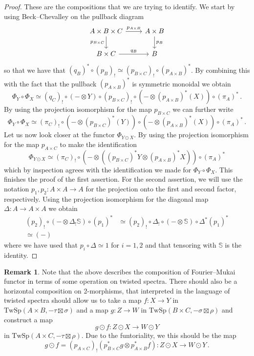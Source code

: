 \documentclass[10pt]{amsart}
\newcommand{\longto}{\longrightarrow}
\theoremstyle{plain}
\theoremstyle{definition}
\newtheorem{rmk}[theorem]{Remark}
\newcommand{\bS}{\mathbb{S}}
\newcommand{\TwSp}{\mathrm{TwSp}}
\begin{document}
\begin{proof}
  These are the compositions that we are trying to identify.
  We start by using Beck--Chevalley on the pullback diagram
  \[
  \begin{tikzcd}
    A \times B \times C \arrow[r,"p_{A \times B}"] \arrow[d,"p_{B \times C}"'] & A \times B \arrow[d,"p_B"] \\
    B \times C \arrow[r,"q_B"] & B
  \end{tikzcd}
  \]
  so that we have that $(q_B)^* \circ (p_B)_! \simeq (p_{B \times C})_! \circ (p_{A \times B})^*$. By combining this with the fact that the pullback $(p_{A \times B})^*$ is symmetric monoidal we obtain
  \[
  \Phi_Y \circ \Phi_X \simeq (q_C)_! \circ (-\otimes Y) \circ (p_{B \times C})_! \circ (- \otimes (p_{A \times B})^*(X)) \circ (\pi_A)^* \,.
  \]
  By using the projection isomorphism for the map $p_{B \times C}$ we can further write
  \[
  \Phi_Y \circ \Phi_X \simeq (\pi_C)_! \circ (-\otimes (p_{B \times C})^*(Y)) \circ (- \otimes (p_{A \times B})^*(X)) \circ (\pi_A)^* \,.
  \]
  Let us now look closer at the functor $\Phi_{Y \odot X}$. By using the projection isomorphism for the map $p_{A \times C}$ to make the identification
  \[
  \Phi_{Y \odot X} \simeq (\pi_{C})_! \circ (- \otimes ((p_{B \times C})^* Y \otimes (p_{A \times B})^* X)) \circ (\pi_A)^*
  \]
  which by inspection agrees with the identification we made for $\Phi_Y \circ \Phi_X$. This finishes the proof of the first assertion.
  For the second assertion, we will use the notation $p_1 , p_2 : A \times A \to A$  for the projection onto the first and second factor, respectively.
  Using the projection isomorphism for the diagonal map $\Delta : A \to A \times A$ we obtain
  \begin{align*}
    (p_2)_!\circ (- \otimes \Delta_! \bS)\circ (p_1)^* &\simeq (p_2)_! \circ \Delta_! \circ (- \otimes \bS) \circ \Delta^* (p_1)^* \\ \simeq (-)
  \end{align*}
  where we have used that $p_i \circ \Delta \simeq 1$ for $i=1,2$ and that tensoring with $\bS$ is the identity.
\end{proof}

\begin{rmk}
  Note that the above describes the composition of Fourier--Mukai functor in terms of some operation on twisted spectra. There should also be a horizontal composition on 2-morphisms, that interpreted in the language of twisted spectra should allow us to take a map $f : X \to Y$ in $\TwSp(A \times B , -\tau \boxtimes \sigma)$ and a map $g : Z \to W$ in $\TwSp(B \times C, -\sigma \boxtimes \rho)$ and construct a map
  \[
  g \odot f : Z \odot X \longto W \odot Y
  \]
  in $\TwSp(A \times C, -\tau \boxtimes \rho)$.
  Due to the funtoriality, we this should be the map
  \[
  g \odot f = (p_{A \times C})_!(p^*_{B \times C} g \otimes p_{A \times B}^* f) : Z \odot X \longto W \odot Y \,.
  \]
\end{rmk}
\end{document}
